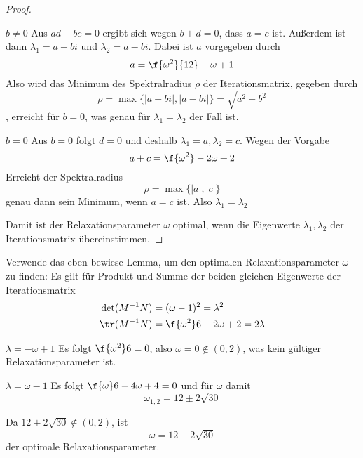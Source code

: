 \documentclass{mywork}
\begin{document}
\begin{aufgabe}
\begin{lem*}
\begin{proof}
				\begin{seg}{$b\neq 0$}
					Aus $ad+bc=0$ ergibt sich wegen $b+d=0$, dass $a=c$ ist.
					Außerdem ist dann $\lambda_1=a+bi$ und $\lambda_2=a-bi$.
					Dabei ist $a$ vorgegeben durch
					\[
						a = \f{\omega^2}{12}-\omega+1
					\]
					Also wird das Minimum des Spektralradius $\rho$ der Iterationsmatrix, gegeben durch
					\[
						\rho = \max\{|a+bi|, |a-bi|\} = \sqrt{a^2+b^2}
					\]
					, erreicht für $b=0$, was genau für $\lambda_1=\lambda_2$ der Fall ist.
				\end{seg}
				\begin{seg}{$b=0$}
					Aus $b=0$ folgt $d=0$ und deshalb $\lambda_1=a, \lambda_2=c$.
					Wegen der Vorgabe
					\[
						a+c = \f{\omega^2} - 2\omega + 2
					\]
					Erreicht der Spektralradius
					\[
						\rho = \max\{|a|,|c|\}
					\]
					genau dann sein Minimum, wenn $a=c$ ist.
					Also $\lambda_1=\lambda_2$
				\end{seg}
				Damit ist der Relaxationsparameter $\omega$ optimal, wenn die Eigenwerte $\lambda_1,\lambda_2$ der Iterationsmatrix übereinstimmen.
			\end{proof}
		\end{lem*}
		Verwende das eben bewiese Lemma, um den optimalen Relaxationsparameter $\omega$ zu finden:
		Es gilt für Produkt und Summe der beiden gleichen Eigenwerte der Iterationsmatrix
		\begin{align*}
			\det(M^{-1}N) &= (\omega-1)^2 = \lambda^2\\
			\tr(M^{-1}N) &= \f{\omega^2}6-2\omega+2 = 2\lambda
		\end{align*}
		\newpage
		\begin{seg}{$\lambda = -\omega+1$}
			Es folgt $\f{\omega^2}6 = 0$, also $\omega=0\not\in(0,2)$, was kein gültiger Relaxationsparameter ist.
		\end{seg}
		\begin{seg}{$\lambda = \omega-1$}
			Es folgt $\f{\omega}6-4\omega +4 = 0$ und für $\omega$ damit
			\[
				\omega_{1,2} = 12 \pm 2\sqrt{30}
			\]
		\end{seg}
		Da $12+2\sqrt{30}\not\in (0,2)$, ist
		\[
			\omega = 12 - 2\sqrt{30}
		\]
		der optimale Relaxationsparameter.
	\end{aufgabe}
\end{document}
